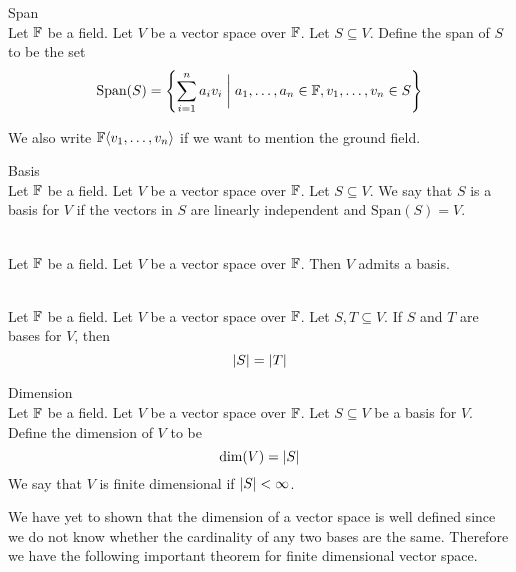 \documentclass[a4paper]{article}
\begin{document}
\begin{defn}{Span}{}\\
Let $\mathbb{F}$ be a field. Let $V$ be a vector space over $\mathbb{F}$. Let $S\subseteq V$. Define the span of $S$ to be the set $$\text{Span}(S)=\left\{\sum_{i=1}^na_iv_i\;\bigg{|}\;a_1,\dots,a_n\in\mathbb{F}, v_1,\dots,v_n\in S\right\}$$
\end{defn}

We also write $\mathbb{F}\langle v_1,\dots,v_n\rangle$ if we want to mention the ground field. 

\begin{defn}{Basis}{}\\
Let $\mathbb{F}$ be a field. Let $V$ be a vector space over $\mathbb{F}$. Let $S\subseteq V$. We say that $S$ is a basis for $V$ if the vectors in $S$ are linearly independent and $\text{Span}(S)=V$. 
\end{defn}

\begin{lmm}{}{}\\
Let $\mathbb{F}$ be a field. Let $V$ be a vector space over $\mathbb{F}$. Then $V$ admits a basis. 
\end{lmm}

\begin{lmm}{}{}\\
Let $\mathbb{F}$ be a field. Let $V$ be a vector space over $\mathbb{F}$. Let $S,T\subseteq V$. If $S$ and $T$ are bases for $V$, then $$\abs{S}=\abs{T}$$
\end{lmm}

\begin{defn}{Dimension}{}\\
Let $\mathbb{F}$ be a field. Let $V$ be a vector space over $\mathbb{F}$. Let $S\subseteq V$ be a basis for $V$. Define the dimension of $V$ to be $$\dim(V)=\abs{S}$$ We say that $V$ is finite dimensional if $\abs{S}<\infty$. 
\end{defn}

We have yet to shown that the dimension of a vector space is well defined since we do not know whether the cardinality of any two bases are the same. Therefore we have the following important theorem for finite dimensional vector space. 
\end{document}
